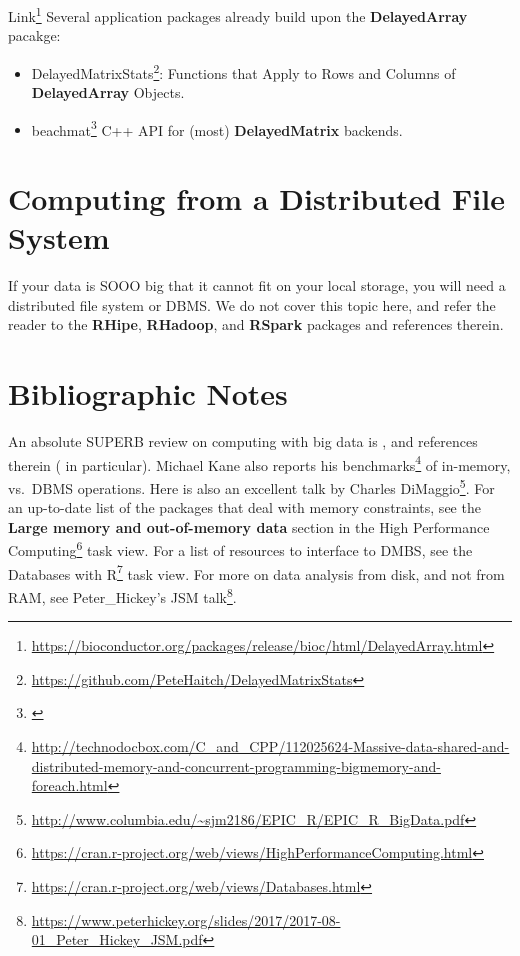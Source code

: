 \documentclass[]{book}
\providecommand{\tightlist}{%
  \setlength{\itemsep}{0pt}\setlength{\parskip}{0pt}}
\renewcommand{\href}[2]{#2\footnote{\url{#1}}}
\theoremstyle{definition}
\theoremstyle{definition}
\theoremstyle{definition}
\theoremstyle{remark}
\begin{document}
\href{https://bioconductor.org/packages/release/bioc/html/DelayedArray.html}{Link}
Several application packages already build upon the \textbf{DelayedArray} pacakge:

\begin{itemize}
\tightlist
\item
  \href{https://github.com/PeteHaitch/DelayedMatrixStats}{DelayedMatrixStats}: Functions that Apply to Rows and Columns of \textbf{DelayedArray} Objects.
\item
  \href{}{beachmat} C++ API for (most) \textbf{DelayedMatrix} backends.
\end{itemize}

\hypertarget{computing-from-a-distributed-file-system}{%
\section{Computing from a Distributed File System}\label{computing-from-a-distributed-file-system}}

If your data is SOOO big that it cannot fit on your local storage, you will need a distributed file system or DBMS.
We do not cover this topic here, and refer the reader to the \textbf{RHipe}, \textbf{RHadoop}, and \textbf{RSpark} packages and references therein.

\hypertarget{bibliographic-notes-13}{%
\section{Bibliographic Notes}\label{bibliographic-notes-13}}

An absolute SUPERB review on computing with big data is \citet{wang2015statistical}, and references therein (\citet{kane2013scalable} in particular).
Michael Kane also reports \href{http://technodocbox.com/C_and_CPP/112025624-Massive-data-shared-and-distributed-memory-and-concurrent-programming-bigmemory-and-foreach.html}{his benchmarks} of in-memory, vs.~DBMS operations.
Here is also an excellent talk by \href{http://www.columbia.edu/~sjm2186/EPIC_R/EPIC_R_BigData.pdf}{Charles DiMaggio}.
For an up-to-date list of the packages that deal with memory constraints, see the \textbf{Large memory and out-of-memory data} section in the \href{https://cran.r-project.org/web/views/HighPerformanceComputing.html}{High Performance Computing} task view.
For a list of resources to interface to DMBS, see the \href{https://cran.r-project.org/web/views/Databases.html}{Databases with R} task view.
For more on data analysis from disk, and not from RAM, see \href{https://www.peterhickey.org/slides/2017/2017-08-01_Peter_Hickey_JSM.pdf}{Peter\_Hickey's JSM talk}.
\end{document}

